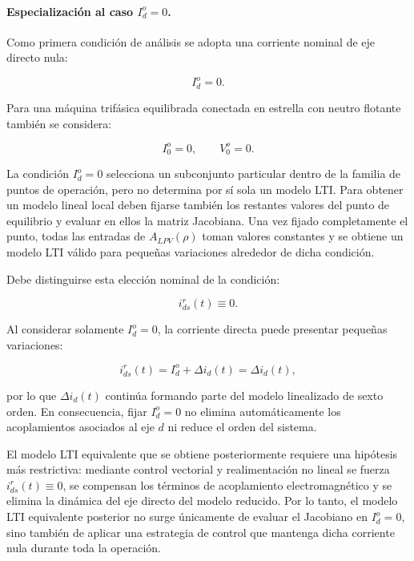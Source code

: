 \documentclass[10pt,a4paper]{article}
\begin{document}
\paragraph{Especialización al caso $I_d^o=0$.}
Como primera condición de análisis se adopta una corriente nominal de eje directo nula:

\begin{equation}
	I_d^o=0.
	\label{eq:punto_nominal_id0}
\end{equation}

Para una máquina trifásica equilibrada conectada en estrella con neutro flotante también se considera:

\begin{equation}
	I_0^o=0,
	\qquad
	V_0^o=0.
	\label{eq:punto_nominal_i00}
\end{equation}

La condición $I_d^o=0$ selecciona un subconjunto particular dentro de la familia de puntos de operación, pero no determina por sí sola un modelo LTI. Para obtener un modelo lineal local deben fijarse también los restantes valores del punto de equilibrio y evaluar en ellos la matriz Jacobiana. Una vez fijado completamente el punto, todas las entradas de $A_{LPV}(\rho)$ toman valores constantes y se obtiene un modelo LTI válido para pequeñas variaciones alrededor de dicha condición.

Debe distinguirse esta elección nominal de la condición:

\begin{equation}
	i_{ds}^r(t)\equiv0.
\end{equation}

Al considerar solamente $I_d^o=0$, la corriente directa puede presentar pequeñas variaciones:

\begin{equation}
	i_{ds}^r(t)
	=
	I_d^o+\Delta i_d(t)
	=
	\Delta i_d(t),
\end{equation}

por lo que $\Delta i_d(t)$ continúa formando parte del modelo linealizado de sexto orden. En consecuencia, fijar $I_d^o=0$ no elimina automáticamente los acoplamientos asociados al eje $d$ ni reduce el orden del sistema.

El modelo LTI equivalente que se obtiene posteriormente requiere una hipótesis más restrictiva: mediante control vectorial y realimentación no lineal se fuerza $i_{ds}^r(t)\equiv0$, se compensan los términos de acoplamiento electromagnético y se elimina la dinámica del eje directo del modelo reducido. Por lo tanto, el modelo LTI equivalente posterior no surge únicamente de evaluar el Jacobiano en $I_d^o=0$, sino también de aplicar una estrategia de control que mantenga dicha corriente nula durante toda la operación.
\end{document}
